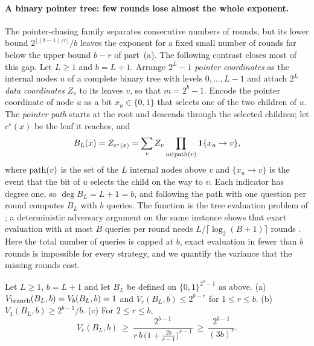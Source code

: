 \paragraph{A binary pointer tree: few rounds lose almost the whole exponent.}
The pointer-chasing family separates consecutive numbers of rounds, but its
lower bound $2^{\lfloor(b-1)/r\rfloor}/b$ leaves the exponent for a fixed
small number of rounds far below the upper bound $b-r$ of part~(a). The
following contrast closes most of this gap. Let $L\ge1$ and $b=L+1$. Arrange
$2^L-1$ \emph{pointer coordinates} as the internal nodes $u$ of a complete
binary tree with levels $0,\ldots,L-1$ and attach $2^L$ \emph{data
coordinates} $Z_v$ to its leaves $v$, so that $m=2^{b}-1$. Encode the pointer
coordinate of node $u$ as a bit $x_u\in\{0,1\}$ that selects one of the two
children of $u$. The \emph{pointer path} starts at the root and descends
through the selected children; let $c^\star(x)$ be the leaf it reaches, and
\[
 B_L(x)=Z_{c^\star(x)}=\sum_{v}Z_v\prod_{u\in{\rm path}(v)}\mathbf 1\{x_u\to v\},
\]
where ${\rm path}(v)$ is the set of the $L$ internal nodes above $v$ and
$\{x_u\to v\}$ is the event that the bit of $u$ selects the child on the way
to $v$. Each indicator has degree one, so $\deg B_L=L+1=b$, and following
the path with one question per round computes $B_L$ with $b$ queries. The
function is the tree evaluation problem of \citet{cook2012}; a deterministic
adversary argument on the same instance shows that exact evaluation with at
most $B$ queries per round needs $L/\lceil\log_2(B+1)\rceil$ rounds
\citep{li2026regex}. Here the total number of queries is capped at $b$, exact
evaluation in fewer than $b$ rounds is impossible for every strategy, and we
quantify the variance that the missing rounds cost.

\begin{theorem}\label{thm:binarytree}
Let $L\ge1$, $b=L+1$ and let $B_L$ be defined on $\{0,1\}^{2^b-1}$ as above.
\textup{(a)} $V_{\rm branch}(B_L,b)=V_b(B_L,b)=1$ and $V_r(B_L,b)\le2^{b-r}$
for $1\le r\le b$.
\textup{(b)} $V_1(B_L,b)\ge2^{b-1}/b$.
\textup{(c)} For $2\le r\le b$,
\[
 V_r(B_L,b)\ \ge\ \frac{2^{b-1}}{r\,b\,\big(1+\tfrac{2b}{r-1}\big)^{r-1}}
 \ \ge\ \frac{2^{b-1}}{(3b)^{r}} .
\]
\end{theorem}

